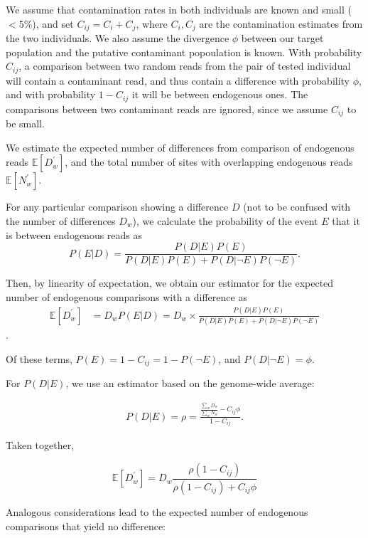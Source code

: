 \documentclass[12pt, letterpaper]{article}
\begin{document}
We assume that contamination rates in both individuals are known and small ($<5\%$), and set $C_{ij} = C_i + C_j$, where $C_i, C_j$ are the contamination estimates from the two individuals. We also assume the divergence $\phi$ between our 
target population and the putative contaminant popoulation is known. With probability $C_{ij}$, a comparison between two random reads from the pair of tested individual will contain a contaminant read, and thus contain a difference with probability $\phi$, and with probability $1 - C_{ij}$ it will be between endogenous ones. The comparisons between two contaminant reads are ignored, since we assume $C_{ij}$ to be small.

We  estimate the expected number of differences from comparison of endogenous reads $\mathbb{E}[D_w^{'}]$, and the total number of sites with overlapping endogenous reads $\mathbb{E}[N_w^{'}]$. 

For any particular comparison showing a difference $D$ (not to be confused with the number of differences $D_w$), we calculate the probability of the event $E$ that it is between endogenous reads as 
\begin{equation}
    P(E|D) = \frac{P(D|E)P(E)}{P(D|E)P(E) + P(D| \neg E)P( \neg E)}.
\end{equation}

Then, by linearity of expectation, we obtain our estimator for the expected number of endogenous comparisons with a difference as 
\begin{align}
    \mathbb{E}[D_w^{'}] &= D_{w} P(E|D) = D_{w} \times \frac{P(D|E)P(E)}{P(D|E)P(E) + P(D| \neg E)P( \neg E)}
\end{align}.

Of these terms, $P(E)= 1 -C_{ij} = 1 - P(\neg E)$, and $P(D| \neg E) = \phi$.

For $P(D|E)$, we use an estimator based on the genome-wide average: 

\begin{align}
    P(D|E) = \rho = \frac{\frac{\sum_w D_w}{\sum_w N_w} - C_{ij} \phi}{1 - C_{ij}}.
\end{align}

Taken together, 

\begin{equation}
 \mathbb{E}[D_w^{'}]= D_{w}\frac{\rho (1-C_{ij})}{\rho(1-C_{ij}) + C_{ij}\phi}
 \end{equation}
 
 Analogous considerations lead to the expected number of endogenous comparisons that yield no difference:
 
\end{document}
